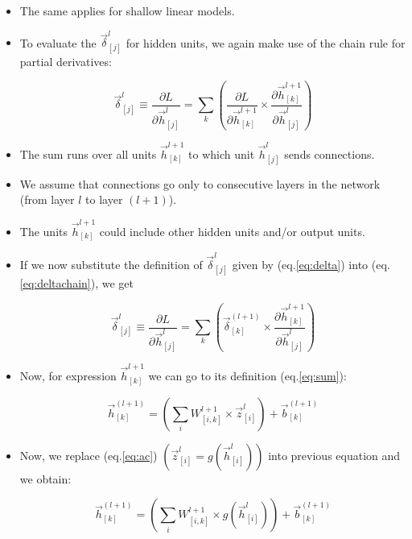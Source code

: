 \begin{itemize}
 \item The same applies for shallow linear models.

 \item To evaluate the $\vec{\delta}_{[j]}^l$ for hidden units, we again make use of the chain rule for partial derivatives:
 
 \begin{equation}
\vec{\delta}_{[j]}^l \equiv \frac{\partial L}{\partial \vec{h}_{[j]}^l} = \sum_{k}\left( \frac{\partial L}{\partial \vec{h}_{[k]}^{l+1}} \times \frac{\partial \vec{h}_{[k]}^{l+1}}{\partial \vec{h}_{[j]}^l}\right)
\label{eq:deltachain}
\end{equation}

\item The sum runs over all units $\vec{h}_{[k]}^{l+1}$ to which unit $\vec{h}_{[j]}^l$ sends connections.

\item We assume that connections go only to consecutive layers in the network (from layer $l$ to layer $(l+1)$).
\item The units $\vec{h}_{[k]}^{l+1}$  could include other hidden units and/or output units.

\item If we now substitute the definition of $\vec{\delta}_{[j]}^l$  given by (eq.\ref{eq:delta}) into (eq.\ref{eq:deltachain}), we get

 \begin{equation}
\vec{\delta}_{[j]}^l \equiv \frac{\partial L}{\partial \vec{h}_{[j]}^l} = \sum_{k}\left( \vec{\delta}_{[k]}^{(l+1)}  \times \frac{\partial \vec{h}_{[k]}^{l+1}}{\partial \vec{h}_{[j]}^l} \right)
\label{eq:delta2}
\end{equation}

\item Now, for expression $\vec{h}_{[k]}^{l+1}$ we can go to its definition (eq.\ref{eq:sum}): 

\begin{displaymath}
\vec{h}_{[k]}^{(l+1)} = \left( \sum_{i} W_{[i,k]}^{l+1} \times \vec{z}_{[i]}^{l}\right) + \vec{b}_{[k]}^{(l+1)} 
\end{displaymath}

\item Now, we replace (eq.\ref{eq:ac}) $(\vec{z}_{[i]}^{l} = g(\vec{h}_{[i]}^{l}))$  
into previous equation and we obtain:

\begin{displaymath}
\vec{h}_{[k]}^{(l+1)} = \left( \sum_{i}   W_{[i,k]}^{l+1} \times g(\vec{h}_{[i]}^{l})\right)  + \vec{b}_{[k]}^{(l+1)}
\end{displaymath}



\end{itemize}
